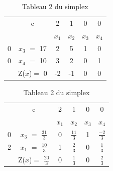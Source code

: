 \documentclass[a4paper, 12pt]{article}
\begin{document}
\begin{table}[h!]	
\centering
	\begin{tabular}{|c|c|c|c|c|c|}
	\hline
      & c & 2 & 1 & 0 & 0 \\ 
      \cline{2-6}
       &  & $x_{1}$ & $x_{2}$  & $x_{3}$  & $x_{4}$ \\
       \hline
   0 & $x_{3}$  $=$ 17 & 2 & 5 & 1 & 0 \\
      \hline
	0 & $x_{4}$ $=$ 10  & 3 & 2 & 0 & 1 \\
	  \hline
	 & Z($x$)$=$ 0 & -2 & -1 & 0 & 0\\
	  \hline
	\end{tabular}
\caption {Tableau 1 du simplex}	
\centering
	\begin{tabular}{|c|c|c|c|c|c|}
	\hline
      & c & 2 & 1 & 0 & 0 \\ 
      \cline{2-6}
       &  & $x_{1}$ & $x_{2}$  & $x_{3}$  & $x_{4}$ \\
       \hline
   0 & $x_{3}$  $=$ $\frac{31}{3}$ & 0 & $\frac{11}{3}$ & 1 & $\frac{-2}{3}$ \\
      \hline
	2 & $x_{1}$ $=$ $\frac{10}{3}$  & 1 & $\frac{2}{3}$ & 0 & $\frac{1}{3}$ \\
	  \hline
	 & Z($x$)$=$ $\frac{20}{3}$ & 0 & $\frac{1}{3}$ & 0 & $\frac{2}{3}$\\
	  \hline
	\end{tabular}
\caption {Tableau 2 du simplex}
\end{table}
\end{document}

